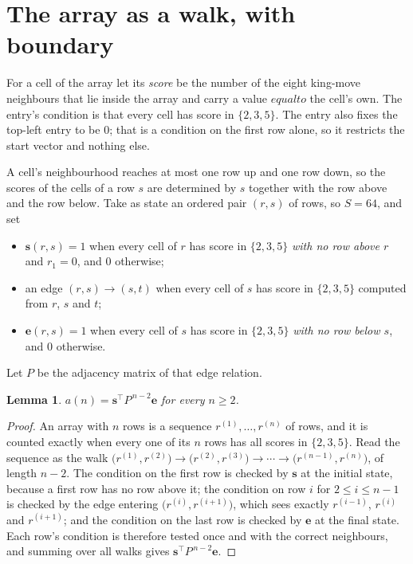 \documentclass[11pt,a4paper]{article}
\theoremstyle{plain}
\newtheorem{lemma}[theorem]{Lemma}
\theoremstyle{definition}
\begin{document}
\section{The array as a walk, with boundary}

For a cell of the array let its \emph{score} be the number of the eight king-move neighbours that lie inside
the array and carry a value $equal to$ the cell's own. The entry's condition is that every cell
has score in $\{2,3,5\}$. The entry also fixes the top-left entry to be $0$; that is a condition on the first row alone, so it restricts the start vector and nothing else.

A cell's neighbourhood reaches at most one row up and one row down, so the scores of the
cells of a row $s$ are determined by $s$ together with the row above and the row below.
Take as state an ordered pair $(r,s)$ of rows, so $S=64$, and set
\begin{itemize}
\item $\mathbf{s}(r,s)=1$ when every cell of $r$ has score in $\{2,3,5\}$ \emph{with no row
above $r$} and $r_1=0$, and $0$ otherwise;
\item an edge $(r,s)\to(s,t)$ when every cell of $s$ has score in $\{2,3,5\}$ computed from
$r$, $s$ and $t$;
\item $\mathbf{e}(r,s)=1$ when every cell of $s$ has score in $\{2,3,5\}$ \emph{with no row
below $s$}, and $0$ otherwise.
\end{itemize}
Let $P$ be the adjacency matrix of that edge relation.

\begin{lemma}\label{lem:walk}
$a(n)=\mathbf{s}^{\!\top}P^{\,n-2}\mathbf{e}$ for every $n\ge2$.
\end{lemma}

\begin{proof}
An array with $n$ rows is a sequence $r^{(1)},\dots,r^{(n)}$ of rows, and it is counted
exactly when every one of its $n$ rows has all scores in $\{2,3,5\}$. Read the sequence as the
walk $\bigl(r^{(1)},r^{(2)}\bigr)\to\bigl(r^{(2)},r^{(3)}\bigr)\to\cdots\to
\bigl(r^{(n-1)},r^{(n)}\bigr)$, of length $n-2$. The condition on the first row is
checked by $\mathbf{s}$ at the initial state, because a first row has no row above it; the
condition on row $i$ for $2\le i\le n-1$ is checked by the edge entering
$\bigl(r^{(i)},r^{(i+1)}\bigr)$, which sees exactly $r^{(i-1)}$, $r^{(i)}$ and
$r^{(i+1)}$; and the condition on the last row is checked by $\mathbf{e}$ at the final
state. Each row's condition is therefore tested once and with the correct neighbours, and
summing over all walks gives $\mathbf{s}^{\!\top}P^{\,n-2}\mathbf{e}$.
\end{proof}
\end{document}
